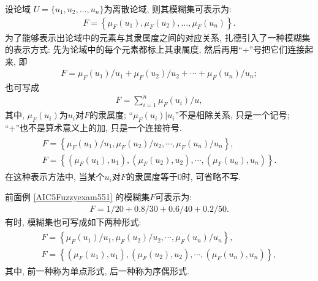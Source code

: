 设论域 $U=\{u_1, u_2, \ldots, u_n\}$为离散论域, 则其模糊集可表示为:
\begin{align}
    F=\left\{\mu_{F}\left(u_{1}\right), \mu_{F}\left(u_{2}\right), \ldots, \mu_{F}\left(u_{n}\right)\right\}.
\end{align}
为了能够表示出论域中的元素与其隶属度之间的对应关系, 扎德引入了一种模糊集的表示方式: 先为论域中的每个元素都标上其隶属度, 然后再用“+”号把它们连接起来, 即
\begin{align}
    F=\mu_{F}\left(u_{1}\right) / u_{1}+\mu_{F}\left(u_{2}\right) / u_{2}+\cdots+\mu_{F}\left(u_{n}\right) / u_{n};
\end{align}
也可写成
\begin{align}
    F=\sum_{i=1}^{n} \mu_{F}\left(u_{i}\right) / u,
\end{align}
其中, $\mu_{F}\left(u_{i}\right)$为$u_i$对$F$的隶属度; “$\mu_{F}\left(u_{i}\right) |u_{i}$”不是相除关系, 只是一个记号; “+”也不是算术意义上的加, 只是一个连接符号.
\begin{align}
    \begin{array}{ll}
        F=\left\{\mu_{F}\left(u_{1}\right) / u_{1}, \mu_{F}\left(u_{2}\right) / u_{2}, \cdots, \mu_{F}\left(u_{n}\right) / u_{n}\right\},\\
        F=\left\{\left(\mu_{F}\left(u_{1}\right), u_{1}\right),\left(\mu_{F}\left(u_{2}\right), u_{2}\right), \cdots,\left(\mu_{F}\left(u_{n}\right), u_{n}\right)\right\}.
    \end{array}
\end{align}
在这种表示方法中, 当某个$u_i$对$F$的隶属度等于$0$时, 可省略不写.
\begin{example}
    前面例 \ref{AIC5Fuzzyexam551} 的模糊集$F$可表示为:
    \begin{align*}
        F=1 / 20+0.8 / 30+0.6 / 40+0.2 / 50.
    \end{align*}
    有时, 模糊集也可写成如下两种形式:
    \begin{align*}
        \begin{array}{l}
            F=\left\{\mu_{F}\left(u_{1}\right) / u_{1}, \mu_{F}\left(u_{2}\right) / u_{2}, \cdots, \mu_{F}\left(u_{n}\right) / u_{n}\right\},\\
            F=\left\{\left(\mu_{F}\left(u_{1}\right), u_{1}\right),\left(\mu_{F}\left(u_{2}\right), u_{2}\right), \cdots,\left(\mu_{F}\left(u_{n}\right), u_{n}\right)\right\},
        \end{array}
    \end{align*}
其中, 前一种称为单点形式, 后一种称为序偶形式.
\end{example}

